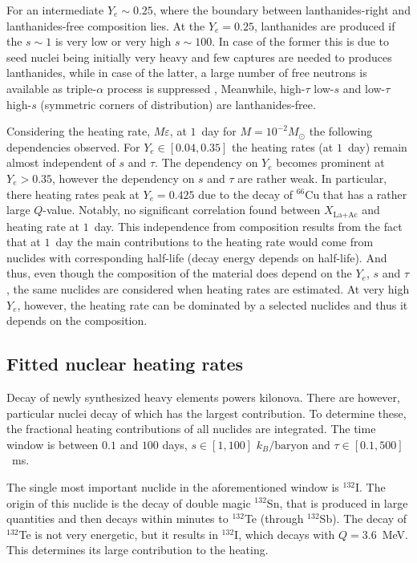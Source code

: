 For an intermediate $Y_e \sim 0.25$, where the boundary between lanthanides-right and lanthanides-free composition lies. At the $Y_e=0.25$, lanthanides are produced if the $s \sim 1$ is very low or very high $s \sim 100$. In case of the former this is due to seed nuclei being initially very heavy and few captures are needed to produces lanthanides, while in case of the latter, a large number of free neutrons is available as triple-$\alpha$ process is suppressed \citep{Hoffman:1996aj}, Meanwhile, high-$\tau$ low-$s$ and low-$\tau$ high-$s$ (symmetric corners of distribution) are lanthanides-free. 

Considering the heating rate, $M\varepsilon$, at $1$~day for $M=10^{-2}M_{\odot}$ the following dependencies observed.
For $Y_e\in[0.04,0.35]$ the heating rates (at $1$~day) remain almost independent of $s$ and $\tau$. The dependency on $Y_e$ becomes prominent at $Y_e>0.35$, however the dependency on $s$ and $\tau$ are rather weak. In particular, there heating rates peak at $Y_e=0.425$ due to the decay of $^{66}$Cu that has a rather large $Q$-value.
Notably, no significant correlation found between $X_{\text{La}+\text{Ac}}$ and heating rate at $1$~day. This independence from composition results from the fact that at $1$~day the main contributions to the heating rate would come from nuclides with corresponding half-life (decay energy depends on half-life). And thus, even though the composition of the material does depend on the $Y_e$, $s$ and $\tau$, the same nuclides are considered when heating rates are estimated. At very high $Y_e$, however, the heating rate can be dominated by a selected nuclides and thus it depends on the composition.


\subsection{Fitted nuclear heating rates}


Decay of newly synthesized heavy elements powers kilonova. There are however, particular nuclei decay of which has the largest contribution. To determine these, the fractional heating contributions of all nuclides are integrated. The time window is between $0.1$ and $100$ days, $s\in[1,100]$ $k_B/\text{baryon}$ and $\tau\in[0.1,500]$~ms. 

The single most important nuclide in the aforementioned window is $^{132}$I. The origin of this nuclide is the decay of double magic $^{132}$Sn, that is produced in large quantities and then decays within minutes to $^{132}$Te (through $^{132}$Sb). The decay of $^{132}$Te is not very energetic, but it results in $^{132}$I, which decays with $Q=3.6$~MeV. This determines its large contribution to the heating. 

